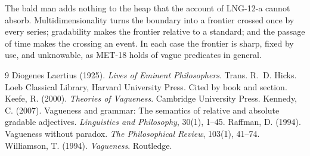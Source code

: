 \documentclass{situationist-preprint}
\begin{document}
The bald man adds nothing to the heap that the account of LNG-12-a cannot absorb. Multidimensionality turns the boundary into a frontier crossed once by every series; gradability makes the frontier relative to a standard; and the passage of time makes the crossing an event. In each case the frontier is sharp, fixed by use, and unknowable, as MET-18 holds of vague predicates in general.

\begin{thebibliography}{9}\small
{} Diogenes Laertius (1925). \emph{Lives of Eminent Philosophers}. Trans. R.~D. Hicks. Loeb Classical Library, Harvard University Press. Cited by book and section.
 Keefe, R. (2000). \emph{Theories of Vagueness}. Cambridge University Press.
 Kennedy, C. (2007). Vagueness and grammar: The semantics of relative and absolute gradable adjectives. \emph{Linguistics and Philosophy}, 30(1), 1--45.
 Raffman, D. (1994). Vagueness without paradox. \emph{The Philosophical Review}, 103(1), 41--74.
 Williamson, T. (1994). \emph{Vagueness}. Routledge.
\end{thebibliography}
\end{document}
